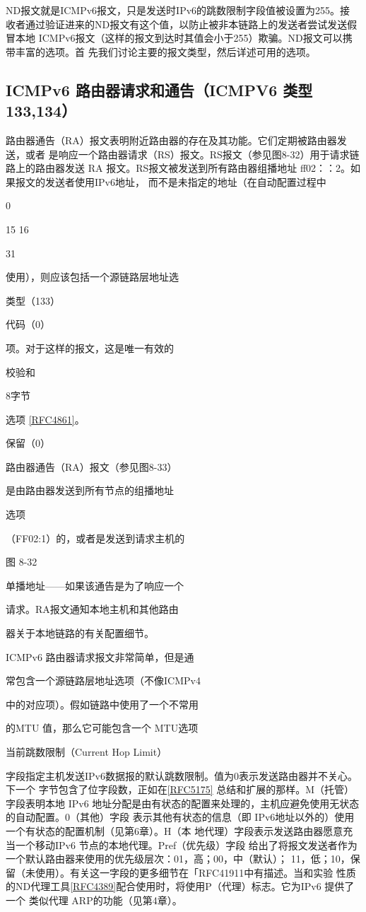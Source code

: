 ND报文就是ICMPv6报文，只是发送时IPv6的跳数限制字段值被设置为255。接
收者通过验证进来的ND报文有这个值，以防止被非本链路上的发送者尝试发送假冒本地
ICMPv6报文（这样的报文到达时其值会小于255）欺骗。ND报文可以携带丰富的选项。首
先我们讨论主要的报文类型，然后详述可用的选项。

\subsection{ICMPv6 路由器请求和通告（ICMPV6 类型 133,134）}
路由器通告（RA）报文表明附近路由器的存在及其功能。它们定期被路由器发送，或者
是响应一个路由器请求（RS）报文。RS报文（参见图8-32）用于请求链路上的路由器发送
RA 报文。RS报文被发送到所有路由器组播地址 ff02：：2。如果报文的发送者使用IPv6地址，
而不是未指定的地址（在自动配置过程中

0

15 16

31

使用），则应该包括一个源链路层地址选

类型（133）

代码（0）

项。对于这样的报文，这是唯一有效的

校验和

8字节

选项 \href{https://www.rfc-editor.org/rfc/rfc4861}{[RFC4861]}。

保留（0）

路由器通告（RA）报文（参见图8-33）

是由路由器发送到所有节点的组播地址

选项

（FF02:1）的，或者是发送到请求主机的

图 8-32

单播地址——如果该通告是为了响应一个

请求。RA报文通知本地主机和其他路由

器关于本地链路的有关配置细节。

ICMPv6 路由器请求报文非常简单，但是通

常包含一个源链路层地址选项（不像ICMPv4

中的对应项）。假如链路中使用了一个不常用

的MTU 值，那么它可能包含一个 MTU选项

当前跳数限制（Current Hop Limit）

字段指定主机发送IPv6数据报的默认跳数限制。值为0表示发送路由器并不关心。下一个
字节包含了位字段数，正如在\href{https://www.rfc-editor.org/rfc/rfc5175}{[RFC5175]} 总结和扩展的那样。M（托管）字段表明本地 IPv6
地址分配是由有状态的配置来处理的，主机应避免使用无状态的自动配置。0（其他）字段
表示其他有状态的信息（即 IPv6地址以外的）使用一个有状态的配置机制（见第6章）。H（本
地代理）字段表示发送路由器愿意充当一个移动IPv6 节点的本地代理。Pref（优先级）字段
给出了将报文发送者作为一个默认路由器来使用的优先级层次：01，高；00，中（默认）；
11，低；10，保留（未使用）。有关这一字段的更多细节在「RFC41911中有描述。当和实验
性质的ND代理工具\href{https://www.rfc-editor.org/rfc/rfc4389}{[RFC4389]}配合使用时，将使用P（代理）标志。它为IPv6 提供了一个
类似代理 ARP的功能（见第4章）。


